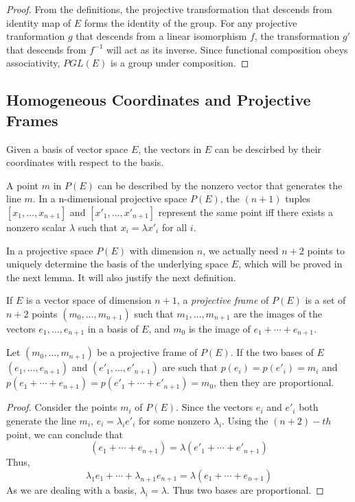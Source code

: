 \begin{proof}
  From the definitions, the projective transformation that descends from identity map of $E$
  forms the identity of the group. For any projective tranformation $g$ that descends from a
  linear isomorphism $f$, the transformation $g'$ that descends from $f^{-1}$ will act as its
  inverse. Since functional composition obeys associativity, $PGL(E)$ is a group under
  composition.
\end{proof}

\subsection{Homogeneous Coordinates and Projective Frames}

Given a basis of vector space $E$, the vectors in $E$ can be descirbed by their coordinates with
respect to the basis. 

\begin{definition}
  A point $m$ in $P(E)$ can be described by the nonzero vector that generates the line $m$. In a
  n-dimensional projective space $P(E)$, the $(n+1)$ tuples $[x_1,\ldots,x_{n+1}]$ and
  $[x'_1,\ldots,x'_{n+1}]$ represent the same point iff there exists a nonzero scalar $\lambda$
  such that $x_i=\lambda x'_i$ for all $i$.
\end{definition}

In a projective space $P(E)$ with dimension $n$, we actually need $n+2$ points to uniquely determine
the basis of the underlying space $E$, which will be proved in the next lemma. It will also
justify the next definition.

\begin{definition}
  If $E$ is a vector space of dimension $n+1$, a \textit{projective frame} of $P(E)$ is a set of
  $n+2$ points  $(m_0,\ldots,m_{n+1})$ such that $m_1,\ldots,m_{n+1}$ are the images of the
  vectors $e_1,\ldots,e_{n+1}$ in a basis of $E$, and $m_0$ is the image of
  $e_1+\cdots+e_{n+1}$.
\end{definition}

\begin{lemma}
  Let $(m_0,\ldots,m_{n+1})$ be a projective frame of $P(E)$. If the two bases of $E$
  $(e_1,\ldots,e_{n+1})$ and $(e'_1,\ldots,e'_{n+1})$ are such that $p(e_i)=p(e'_i)=m_i$ and
  $p(e_1+\cdots+e_{n+1})=p(e'_1+\cdots+e'_{n+1})=m_0$, then they are proportional.
\end{lemma}

\begin{proof}
  Consider the points $m_i$ of $P(E)$. Since the vectors $e_i$ and $e'_i$ both generate the line
  $m_i$, $e_i=\lambda_i e'_i$ for some nonzero $\lambda_i$. Using the $(n+2)-th$ point, we can
  conclude that 
  \[
    (e_1+\cdots+e_{n+1})=\lambda(e'_1+\cdots+e'_{n+1})
  \]
  Thus,
  \[
    \lambda_1e_1+\cdots+\lambda_{n+1}e_{n+1}=\lambda(e_1+\cdots+e_{n+1})
  \]
  As we are dealing with a basis, $\lambda_i=\lambda$. Thus two bases are proportional.
\end{proof}

